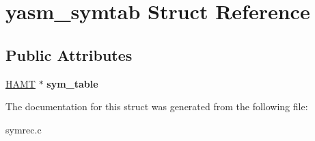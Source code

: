 \hypertarget{structyasm__symtab}{\section{yasm\-\_\-symtab Struct Reference}
\label{structyasm__symtab}
}
\subsection*{Public Attributes}
\begin{DoxyCompactItemize}
\item 
\hypertarget{structyasm__symtab_a3a54dac09ab7be862498c23ddd4e62a3}{\hyperlink{struct_h_a_m_t}{H\-A\-M\-T} $\ast$ {\bfseries sym\-\_\-table}}\label{structyasm__symtab_a3a54dac09ab7be862498c23ddd4e62a3}

\end{DoxyCompactItemize}


The documentation for this struct was generated from the following file\-:\begin{DoxyCompactItemize}
\item 
symrec.\-c\end{DoxyCompactItemize}
